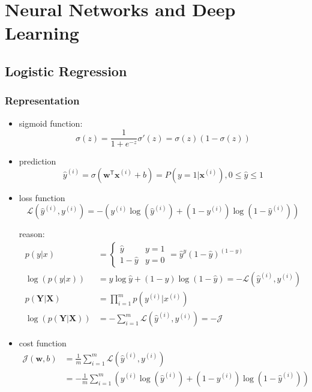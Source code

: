 \ifx\PREAMBLE\undefined


\fi

\chapter{Neural Networks and Deep Learning}
\section{Logistic Regression}
\subsection{Representation}

\begin{itemize}
\item sigmoid function: 
\[\sigma(z)=\frac{1}{1+e^{-z}} \sigma'(z)=\sigma(z)(1-\sigma(z))\]
\item prediction
\[\hat{y}^{(i)}=\sigma(\mathbf{w}^{\mathsf{T}}\mathbf{x}^{(i)} + b)=P(y=1|\mathbf{x}^{(i)}), 0 \le \hat{y} \le 1\]
\item loss function
\[\mathcal{L}(\hat{y}^{(i)}, y^{(i)})=-\left(y^{(i)}\log(\hat{y}^{(i)})+(1-y^{(i)})\log(1-\hat{y}^{(i)})\right)\]

reason: 
\begin{align*}
p(y|x)&=\begin{cases}
\hat{y} & y=1\\
1-\hat{y} & y=0
\end{cases}
=\hat{y}^y(1-\hat{y})^{(1-y)}\\
\log(p(y|x))&=y\log\hat{y}+(1-y)\log(1-\hat{y})=-\mathcal{L}(\hat{y}^{(i)}, y^{(i)})\\
p(\mathbf{Y}|\mathbf{X})&=\displaystyle\prod_{i=1}^mp(y^{(i)}|x^{(i)})\\
\log\left(p(\mathbf{Y}|\mathbf{X})\right)&=-\displaystyle\sum_{i=1}^m\mathcal{L}(\hat{y}^{(i)}, y^{(i)})=-\mathcal{J}
\end{align*}

\item cost function
\begin{align*}
\mathcal{J}(\mathbf{w},b)&=\frac{1}{m}\displaystyle\sum_{i=1}^m\mathcal{L}(\hat{y}^{(i)}, y^{(i)})\\
&=-\frac{1}{m}\displaystyle\sum_{i=1}^{m}\left(y^{(i)}\log(\hat{y}^{(i)})+(1-y^{(i)})\log(1-\hat{y}^{(i)})\right)
\end{align*}
\end{itemize}

